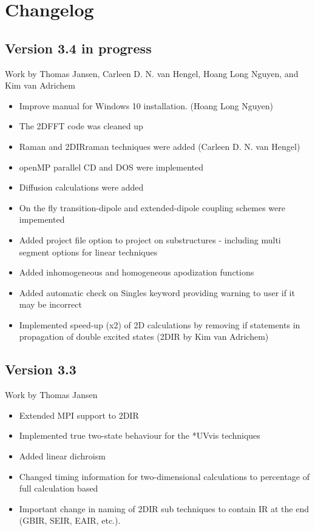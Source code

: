 \section{Changelog}
\subsection{Version 3.4 in progress}
{\small Work by Thomas Jansen, Carleen D. N. van Hengel, Hoang Long Nguyen, and Kim van Adrichem}
\begin{itemize}
\item Improve manual for Windows 10 installation. (Hoang Long Nguyen)
\item The 2DFFT code was cleaned up
\item Raman and 2DIRraman techniques were added (Carleen D. N. van Hengel)
\item openMP parallel CD and DOS were implemented
\item Diffusion calculations were added
\item On the fly transition-dipole and extended-dipole coupling schemes were impemented
\item Added project file option to project on substructures - including multi segment options for linear techniques
\item Added inhomogeneous and homogeneous apodization functions
\item Added automatic check on Singles keyword providing warning to user if it may be incorrect
\item Implemented speed-up (x2) of 2D calculations by removing if statements in propagation of double excited states (2DIR by Kim van Adrichem)
\end{itemize}
\subsection{Version 3.3}
{\small Work by Thomas Jansen}
\begin{itemize}
\item Extended MPI support to 2DIR
\item Implemented true two-state behaviour for the *UVvis techniques
\item Added linear dichroism
\item Changed timing information for two-dimensional calculations to percentage of full calculation based
\item Important change in naming of 2DIR sub techniques to contain IR at the end (GBIR, SEIR, EAIR, etc.).
\end{itemize}
